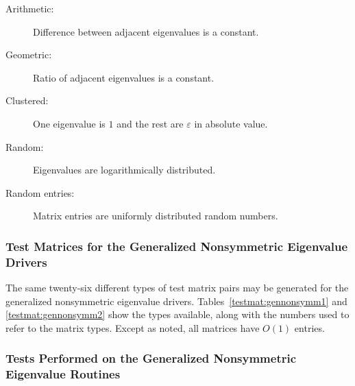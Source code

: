 \begin{description}
\item[{\rm Arithmetic:}] Difference between adjacent eigenvalues is a constant.
\item[{\rm Geometric:}]  Ratio of adjacent eigenvalues is a constant.
\item[{\rm Clustered:}]  One eigenvalue is $1$ and the rest are $\varepsilon$
                   in absolute value.
\item[{\rm Random:}]     Eigenvalues are logarithmically distributed.
\item[{\rm Random entries:}]     Matrix entries are uniformly distributed random
                         numbers.
\end{description}

\subsubsection{Test Matrices for the
		Generalized Nonsymmetric Eigenvalue Drivers}

\dent
The same twenty-six different types of test matrix pairs may be generated for
the generalized nonsymmetric eigenvalue drivers.
Tables~\ref{testmat:gennonsymm1} and \ref{testmat:gennonsymm2}
show the types available,
along with the numbers used to refer to the matrix types.
Except as noted, all matrices have $O(1)$ entries.

\subsubsection{Tests Performed on the
               Generalized Nonsymmetric Eigenvalue Routines}

